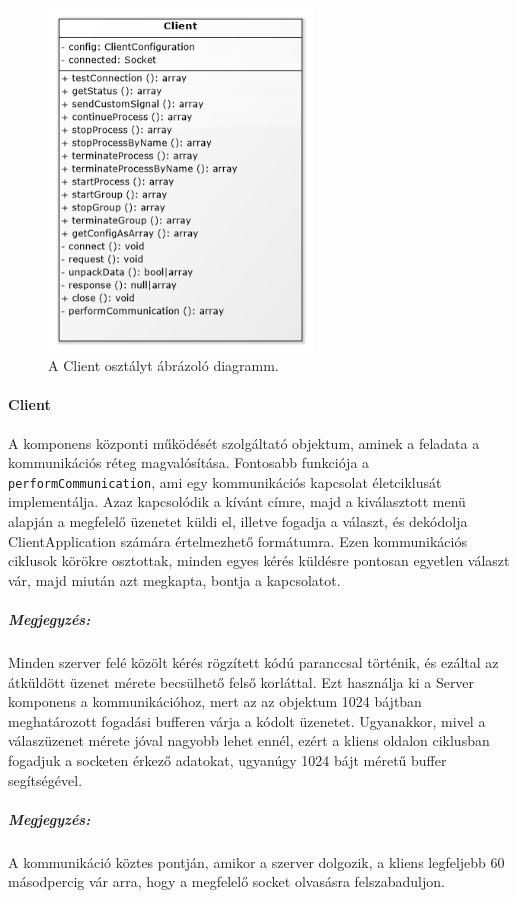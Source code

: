 \documentclass[12pt]{report}
\begin{document}
    \begin{figure}[ht]
       \centering
         \includegraphics[width=7cm]{pics/clie.png}
	  \caption{A Client osztályt ábrázoló diagramm.}
  \end{figure}
  
\paragraph{Client}
A komponens központi működését szolgáltató objektum, aminek a feladata a kommunikációs réteg magvalósítása. Fontosabb funkciója a \verb|performCommunication|, ami egy kommunikációs kapcsolat életciklusát implementálja. Azaz kapcsolódik a kívánt címre, majd a kiválasztott menü alapján a megfelelő üzenetet küldi el, illetve fogadja a választ, és dekódolja  ClientApplication számára értelmezhető formátumra. Ezen kommunikációs ciklusok körökre osztottak, minden egyes kérés küldésre pontosan egyetlen választ vár, majd miután azt megkapta, bontja a kapcsolatot.
\subparagraph{Megjegyzés:}
Minden szerver felé közölt kérés rögzített kódú paranccsal történik, és ezáltal az átküldött üzenet mérete becsülhető felső korláttal. Ezt használja ki a Server komponens a kommunikációhoz, mert az az objektum 1024 bájtban meghatározott fogadási bufferen várja a kódolt üzenetet. Ugyanakkor, mivel a válaszüzenet mérete jóval nagyobb lehet ennél, ezért a kliens oldalon ciklusban fogadjuk a socketen érkező adatokat, ugyanúgy 1024 bájt méretű buffer segítségével.
\subparagraph{Megjegyzés:}
A kommunikáció köztes pontján, amikor a szerver dolgozik, a kliens legfeljebb 60 másodpercig vár arra, hogy a megfelelő socket olvasásra felszabaduljon.
\end{document}
